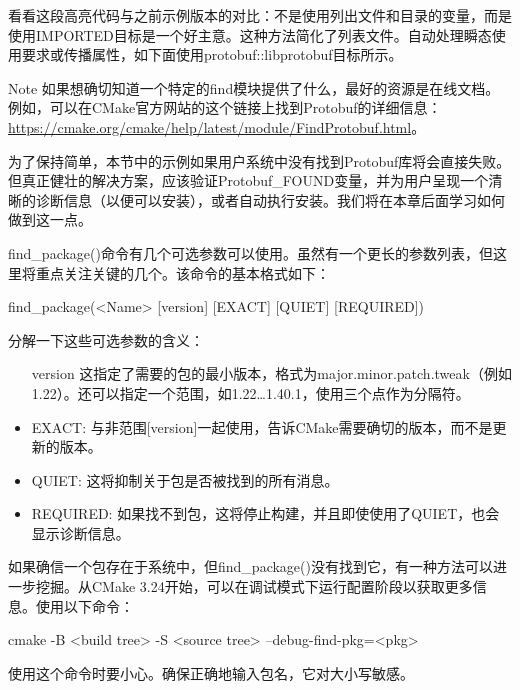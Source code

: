 看看这段高亮代码与之前示例版本的对比：不是使用列出文件和目录的变量，而是使用IMPORTED目标是一个好主意。这种方法简化了列表文件。自动处理瞬态使用要求或传播属性，如下面使用protobuf::libprotobuf目标所示。

\begin{myNotic}{Note}
如果想确切知道一个特定的find模块提供了什么，最好的资源是在线文档。例如，可以在CMake官方网站的这个链接上找到Protobuf的详细信息：\url{https://cmake.org/cmake/help/latest/module/FindProtobuf.html}。
\end{myNotic}

为了保持简单，本节中的示例如果用户系统中没有找到Protobuf库将会直接失败。但真正健壮的解决方案，应该验证Protobuf\_FOUND变量，并为用户呈现一个清晰的诊断信息（以便可以安装），或者自动执行安装。我们将在本章后面学习如何做到这一点。

find\_package()命令有几个可选参数可以使用。虽然有一个更长的参数列表，但这里将重点关注关键的几个。该命令的基本格式如下：

\begin{shell}
find_package(<Name> [version] [EXACT] [QUIET] [REQUIRED])
\end{shell}

分解一下这些可选参数的含义：

\begin{itemize}
\item
[version] 这指定了需要的包的最小版本，格式为major.minor.patch.tweak（例如1.22）。还可以指定一个范围，如1.22…1.40.1，使用三个点作为分隔符。

\item
EXACT: 与非范围[version]一起使用，告诉CMake需要确切的版本，而不是更新的版本。

\item
QUIET: 这将抑制关于包是否被找到的所有消息。

\item
REQUIRED: 如果找不到包，这将停止构建，并且即使使用了QUIET，也会显示诊断信息。
\end{itemize}

如果确信一个包存在于系统中，但find\_package()没有找到它，有一种方法可以进一步挖掘。从CMake 3.24开始，可以在调试模式下运行配置阶段以获取更多信息。使用以下命令：

\begin{shell}
cmake -B <build tree> -S <source tree> --debug-find-pkg=<pkg>
\end{shell}

使用这个命令时要小心。确保正确地输入包名，它对大小写敏感。

